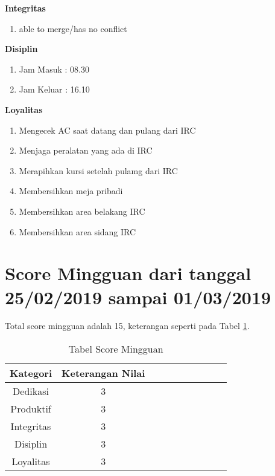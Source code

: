 \begin{enumerate}
\textbf{Integritas}
\begin{enumerate}
\item able to merge/has no conflict
\end{enumerate}

\textbf{Disiplin}
\begin{enumerate}
\item Jam Masuk : 08.30
\item Jam Keluar : 16.10
\end{enumerate}

\textbf{Loyalitas}
\begin{enumerate}
\item Mengecek AC saat datang dan pulang dari IRC
\item Menjaga peralatan yang ada di IRC
\item Merapihkan kursi setelah pulamg dari IRC
\item Membersihkan meja pribadi
\item Membersihkan area belakang IRC
\item Membersihkan area sidang IRC
\end{enumerate}
\end{enumerate}


\section{Score Mingguan dari tanggal 25/02/2019 sampai 01/03/2019}
Total score mingguan adalah 15, keterangan seperti pada Tabel \ref{table:scoremingguan}.
\begin{table}[!ht]
\centering
\begin{tabular}{ |c|c|c|c|c|c|c|c|c|c| }
\hline
Kategori & Keterangan Nilai \\
\hline
Dedikasi & 3 \\
\hline
Produktif & 3 \\
\hline
Integritas & 3 \\
\hline
Disiplin & 3 \\
\hline
Loyalitas & 3 \\
\hline
\end{tabular}
\caption{Tabel Score Mingguan}
\label{table:scoremingguan}
\end{table}


